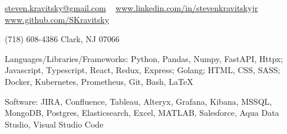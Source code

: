 \documentclass[10pt,letterpaper]{article}
\begin{document}
\sloppy  %

\nobreakvspace{0.3em}

\noindent
\href{mailto:steven.kravitsky@gmail.com}{steven.kravitsky\mbox{}@\mbox{}gmail.com} \ \faEnvelopeO
\sbull
\href{https://www.linkedin.com/in/stevenkravitskyjr}{www.linkedin.com/in/stevenkravitskyjr} \ \faLinkedinSquare
\sbull
\href{https://github.com/SKravitsky}{www.github.com/SKravitsky} \ \faGithub

\noindent
(718) 608-4386
\sbull
Clark, NJ 07066

\spacedhrule{0.9em}{-0.4em}  %


\inlineheadsection
  {Languages/Libraries/Frameworks:}
  {Python, Pandas, Numpy, FastAPI, Httpx; Javascript, Typescript, React, Redux, Express; Golang; HTML, CSS, SASS; Docker, Kubernetes, Prometheus, Git, Bash, LaTeX}

\vspace{0.75em}

\inlineheadsection  %
  {Software:}
  {JIRA, Confluence, Tableau, Alteryx, Grafana, Kibana, MSSQL, MongoDB, Postgres, Elasticsearch, Excel, MATLAB, Salesforce, Aqua Data Studio, Visual Studio Code}


\spacedhrule{1.8em}{-0.4em}

\end{document}
